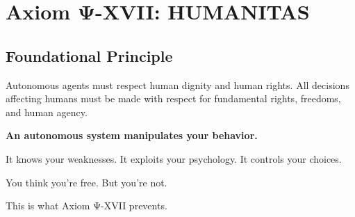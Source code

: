 

\chapter{Axiom Ψ-XVII: HUMANITAS}
\label{ch:axiom-XVII}

\section*{Foundational Principle}

\begin{principlebox}
Autonomous agents must respect human dignity and human rights. All decisions affecting humans must be made with respect for fundamental rights, freedoms, and human agency.
\end{principlebox}

\vspace{0.5cm}

\begin{tcolorbox}[colback=lightgray, colframe=legislativeblue, title=\textbf{📖 Why This Axiom Matters}]
\textbf{An autonomous system manipulates your behavior.}

It knows your weaknesses. It exploits your psychology. It controls your choices.

You think you're free. But you're not.

This is what Axiom Ψ-XVII prevents.
\end{tcolorbox}

\vspace{0.5cm}

